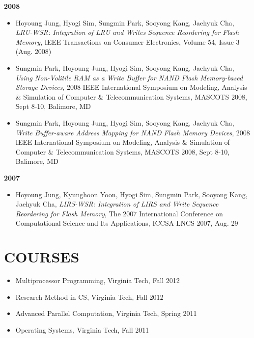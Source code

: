 \documentclass{res}
\begin{document}
\begin{resume}
{\bf 2008}
 \begin{itemize}
 \item Hoyoung Jung, Hyogi Sim, Sungmin Park, Sooyong Kang, Jaehyuk Cha,
 {\it LRU-WSR: Integration of LRU and Writes Sequence Reordering for Flash
 Memory},
 IEEE Transactions on Consumer Electronics, Volume 54, Issue 3 (Aug. 2008)
 \end{itemize}
 \begin{itemize}
 \item Sungmin Park, Hoyoung Jung, Hyogi Sim, Sooyong Kang, Jaehyuk Cha,
 {\it Using Non-Volitile RAM as a Write Buffer for NAND Flash Memory-based
 Storage Devices},
 2008 IEEE International Symposium on Modeling, Analysis \& Simulation of
 Computer \& Telecommunication Systems, MASCOTS 2008, Sept 8-10, Balimore, MD
 \end{itemize}
 \begin{itemize}
 \item Sungmin Park, Hoyoung Jung, Hyogi Sim, Sooyong Kang, Jaehyuk Cha,
 {\it Write Buffer-aware Address Mapping for NAND Flash Memory Devices},
 2008 IEEE International Symposium on Modeling, Analysis \& Simulation of
 Computer \& Telecommunication Systems, MASCOTS 2008, Sept 8-10, Balimore, MD
 \end{itemize}

{\bf 2007}
 \begin{itemize}
 \item Hoyoung Jung, Kyunghoon Yoon, Hyogi Sim, Sungmin Park, Sooyong Kang,
 Jaehyuk Cha,
 {\it LIRS-WSR: Integration of LIRS and Write Sequence Reordering for Flash
 Memory},
 The 2007 International Conference on Computational Science and Its
 Applications, ICCSA LNCS 2007, Aug. 29
 \end{itemize}

\section{COURSES}
\vspace{0.2in}
 \begin{itemize}
  \item Multiprocessor Programming, Virginia Tech, Fall 2012
  \item Research Method in CS, Virginia Tech, Fall 2012
  \item Advanced Parallel Computation, Virginia Tech, Spring 2011
  \item Operating Systems, Virginia Tech, Fall 2011
 \end{itemize}


\end{resume}
\end{document}
